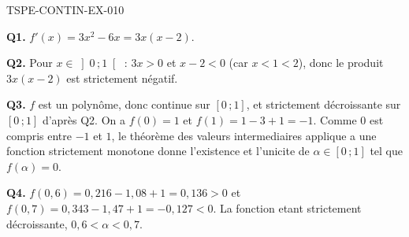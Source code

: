 \begin{corrige}{TSPE-CONTIN-EX-010}

\textbf{Q1.} $f'(x) = 3x^2 - 6x = 3x(x-2)$.

\textbf{Q2.} Pour $x \in \left]0\,;1\right[$ : $3x > 0$ et $x - 2 < 0$ (car $x < 1 < 2$), donc le produit $3x(x-2)$ est strictement négatif.

\textbf{Q3.} $f$ est un polynôme, donc continue sur $[0\,;1]$, et strictement décroissante sur $[0\,;1]$ d'après Q2. On a $f(0) = 1$ et $f(1) = 1 - 3 + 1 = -1$. Comme $0$ est compris entre $-1$ et $1$, le théorème des valeurs intermediaires applique a une fonction strictement monotone donne l'existence et l'unicite de $\alpha \in [0\,;1]$ tel que $f(\alpha) = 0$.

\textbf{Q4.} $f(0{,}6) = 0{,}216 - 1{,}08 + 1 = 0{,}136 > 0$ et $f(0{,}7) = 0{,}343 - 1{,}47 + 1 = -0{,}127 < 0$. La fonction etant strictement décroissante, $0{,}6 < \alpha < 0{,}7$.
\end{corrige}
